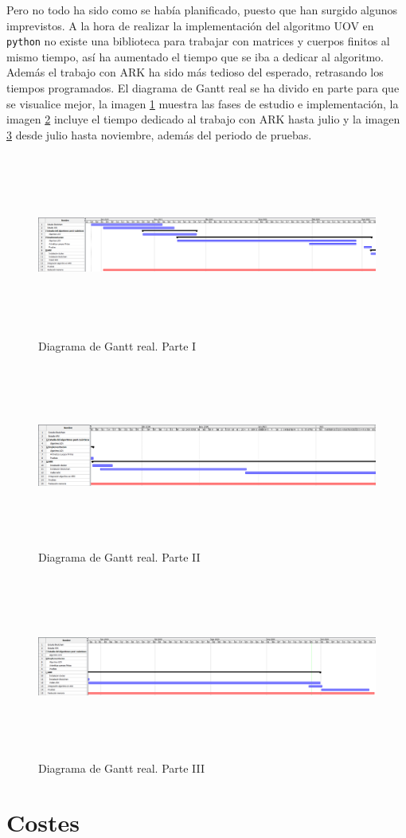 Pero no todo ha sido como se había planificado, puesto que han surgido algunos imprevistos. A la hora de realizar la implementación del algoritmo UOV en \texttt{python} no existe una biblioteca para trabajar con matrices y cuerpos finitos al mismo tiempo, así ha aumentado el tiempo que se iba a dedicar al algoritmo. Además el trabajo con ARK ha sido más tedioso del esperado, retrasando los tiempos programados. El diagrama de Gantt real se ha divido en parte para que se visualice mejor, la imagen \ref{fig:gantt-real-1} muestra las fases de estudio e implementación, la imagen \ref{fig:gantt-real-2} incluye el tiempo dedicado al trabajo con ARK hasta julio y la imagen \ref{fig:gantt-real-3} desde julio hasta noviembre, además del periodo de pruebas.\\


\begin{figure}[h]
	\centering
	\includegraphics[width=15cm,height=6cm]{figuras/Gantt_1.png}
	\caption{Diagrama de Gantt real. Parte I}
	\label{fig:gantt-real-1}
\end{figure}

\begin{figure}[h]
	\centering
	\includegraphics[width=15cm,height=6cm]{figuras/Gantt_2.png}
	\caption{Diagrama de Gantt real. Parte II}
	\label{fig:gantt-real-2}
\end{figure}

\begin{figure}[h]
	\centering
	\includegraphics[width=15cm,height=6cm]{figuras/Gantt_3.png}
	\caption{Diagrama de Gantt real. Parte III}
	\label{fig:gantt-real-3}
\end{figure}

\section{Costes}